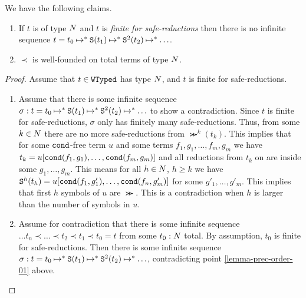 \begin{lemma}\label{lemma-prec-order}
  We have the following claims.
  \begin{enumerate}
  \item\label{lemma-prec-order-01}
    If $t$ is of type ${N}$ and $t$ is \emph{finite for safe-reductions}
    then there is no infinite sequence 
    $t = t_0 \mathbin{\mapsto}^{*} {\tt S}(t_1) \mathbin{\mapsto}^{*} {\tt S}^2(t_2) \mathbin{\mapsto}^{*} \ldots$.

  \item\label{lemma-prec-order-02}
    $\prec$ is well-founded on total terms of type ${N}$.
  \end{enumerate}
\end{lemma}
\begin{proof}%
Assume that $t \in {\tt WTyped}$ has type ${N}$, and $t$ is finite for safe-reductions.
\begin{enumerate}
\item 
Assume that there is some infinite sequence 
$\sigma: t = t_0 \mathbin{\mapsto}^{*} {\tt S}(t_1) \mathbin{\mapsto}^{*} {\tt S}^2(t_2) \mathbin{\mapsto}^{*} \ldots$ 
to show a contradiction. Since $t$ is finite for safe-reductions, 
$\sigma$ only has finitely many safe-reductions. 
Thus, from some $k\in{N}$ there are no more safe-reductions from
$\Succ^k(t_k)$. This implies that for some ${\tt cond}$-free term 
$u$ and some terms $f_1, g_1, \ldots, f_m, g_m$ we have
$t_k = u[{\tt cond}(f_1,g_1), \ldots, {\tt cond}(f_m,g_m)]$ and all reductions from $t_k$ on are inside
some $g_1, \ldots, g_m$. This means for all $h \in {N}$, $h \ge k$ we  have
${\tt S}^{h}(t_{h}) =  u[{\tt cond}(f_1,g'_1), \ldots, {\tt cond}(f_n,g'_m)]$ for some 
$g'_1, \ldots, g'_m$. This implies that first $h$ symbols of $u$ are $\Succ$.
This is a contradiction when $h$ is larger than 
the number of symbols in $u$.

\item
Assume for contradiction that there is some infinite sequence
$\ldots t_n \prec \ldots \prec t_2 \prec t_1 \prec t_0 = t$
from some $t_0:{N}$ total. By assumption, $t_0$ is finite for safe-reductions.
Then there is some infinite sequence 
$\sigma: t = t_0 \mathbin{\mapsto}^{*} {\tt S}(t_1) \mathbin{\mapsto}^{*} {\tt S}^2(t_2) \mathbin{\mapsto}^{*} \ldots$,
contradicting point \ref{lemma-prec-order-01} above.
\end{enumerate}
\end{proof}

